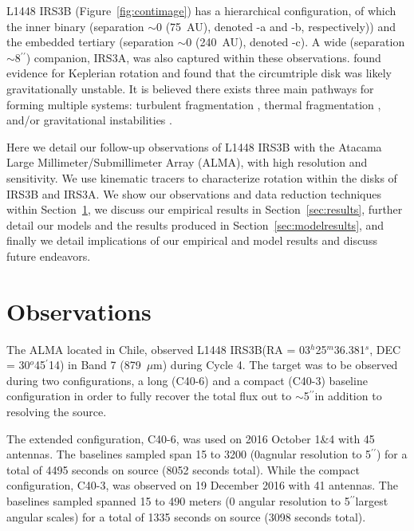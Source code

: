 \documentclass[preprint,12pt]{aastex62}
\renewcommand{\arcsec}{$^{\prime\prime}$}
\renewcommand{\arcmin}{$^{\prime}$}
\renewcommand{\deg}{$^{o}$}
\renewcommand{\micron}{$\mu$m}
\newcommand{\ab}{$\sim$}
\newcommand{\source}{L1448 IRS3B}
\newcommand{\ra}{03$^{h}$25$^{m}$36.381$^{s}$}
\newcommand{\dec}{30\deg45\arcmin14\farcs710}
\newcommand{\radec}{RA = \ra, DEC = \dec}
\begin{document}
L1448 IRS3B (Figure~\ref{fig:contimage}) has a hierarchical configuration, of which the inner binary (separation \ab0 (75~AU), denoted -a and -b, respectively)) and the embedded tertiary (separation \ab0 (240~AU), denoted -c). A wide (separation \ab 8\arcsec) companion, IRS3A, was also captured within these observations. \citet{2016ApJ...818...73T}\space found evidence for Keplerian rotation and found that the circumtriple disk was likely gravitationally unstable. It is believed there exists three main pathways for forming multiple systems: turbulent fragmentation \citep[1000s of AU; e.g.][]{1989ApJ...347..959A,2010ApJ...708.1585K,2012MNRAS.419.3115B}, thermal fragmentation \citep[1000s of AU; e.g.][]{2013ApJ...764..136B}, and/or gravitational instabilities \citep[100s of AU; e.g.][]{2011MNRAS.410..559M,2009MNRAS.392..413S}.

Here we detail our follow-up observations of L1448 IRS3B with the Atacama Large Millimeter/Submillimeter Array (ALMA), with high resolution and sensitivity. We use kinematic tracers to characterize rotation within the disks of IRS3B and IRS3A. We show our observations and data reduction techniques within Section~\ref{sec:obs}, we discuss our empirical results in Section~\ref{sec:results}, further detail our models and the results produced in Section~\ref{sec:modelresults}, and finally we detail implications of our empirical and model results and discuss future endeavors. 


\section{Observations}\label{sec:obs}
The ALMA located in Chile, observed \source\space(\radec) in Band 7 (879~\micron) during Cycle 4.
The target was to be observed during two configurations, a long (C40-6) and a compact (C40-3) baseline configuration in order to fully recover the total flux out to \ab5\arcsec\space in addition to resolving the source.

The extended configuration, C40-6, was used on 2016 October 1\&4 with 45 antennas. The baselines sampled span 15 to 3200 (0\space agnular resolution to 5\arcsec) for a total of 4495 seconds on source (8052 seconds total). While the compact configuration, C40-3, was observed on 19 December 2016 with 41 antennas. The baselines sampled spanned 15 to 490 meters (0 angular resolution to 5\arcsec largest angular scales) for a total of 1335 seconds on source (3098 seconds total).
\end{document}
